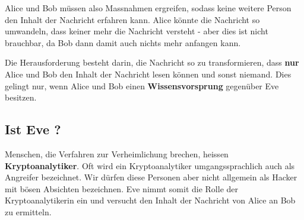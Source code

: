 Alice und Bob müssen also Massnahmen ergreifen, sodass keine weitere Person den Inhalt der Nachricht erfahren kann. Alice könnte die Nachricht so umwandeln, dass keiner mehr die Nachricht versteht - aber dies ist nicht brauchbar, da Bob dann damit auch nichts mehr anfangen kann.

\begin{important}
Die Herausforderung besteht darin, die Nachricht so zu transformieren, dass \textbf{nur} Alice und Bob den Inhalt der Nachricht lesen können und sonst niemand. Dies gelingt nur, wenn Alice und Bob einen \textbf{Wissensvorsprung} gegenüber Eve besitzen.
\end{important}

\subsection{Ist Eve \protect{}?}


 Menschen, die Verfahren zur Verheimlichung brechen, heissen \textbf{Kryptoanalytiker}. Oft wird ein Kryptoanalytiker umgangssprachlich auch als Angreifer bezeichnet. Wir dürfen diese Personen aber nicht allgemein als Hacker mit bösen Absichten bezeichnen. Eve nimmt somit die Rolle der Kryptoanalytikerin ein und versucht den Inhalt der Nachricht von Alice an Bob zu ermitteln.
